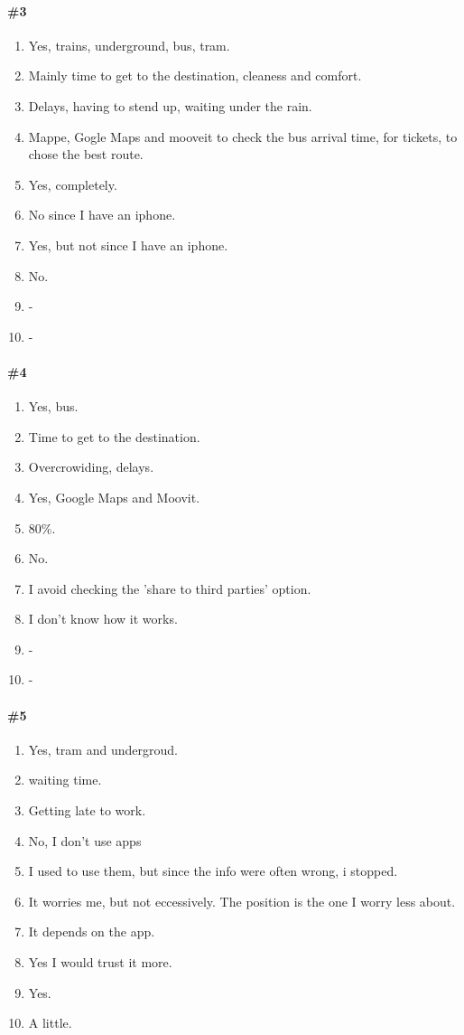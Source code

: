 \documentclass[a4paper, 10pt]{article}
\begin{document}
\paragraph*{\#3}
\begin{enumerate}
    \item Yes, trains, underground, bus, tram.
    \item Mainly time to get to the destination, cleaness and comfort.
    \item Delays, having to stend up, waiting under the rain.
    \item Mappe, Gogle Maps and mooveit to check the bus arrival time,
     for tickets, to chose the best route.
    \item Yes, completely.
    \item No since I have an iphone.
    \item Yes, but not since I have an iphone.
    \item No.
    \item -
    \item -
\end{enumerate}

\paragraph*{\#4}
\begin{enumerate}
    \item Yes, bus.
    \item Time to get to the destination.
    \item Overcrowiding, delays.
    \item Yes, Google Maps and Moovit.
    \item 80\%.
    \item No.
    \item I avoid checking the 'share to third parties' option.
    \item I don't know how it works.
    \item -
    \item -
\end{enumerate}

\paragraph*{\#5}
\begin{enumerate}
    \item Yes, tram and undergroud.
    \item waiting time.
    \item Getting late to work.
    \item No, I don't use apps
    \item I used to use them, but since the info were often wrong, i stopped.
    \item It worries me, but not eccessively. The position is the one I worry less about.
    \item It depends on the app.
    \item Yes I would trust it more.
    \item Yes.
    \item A little.
\end{enumerate}
\end{document}
